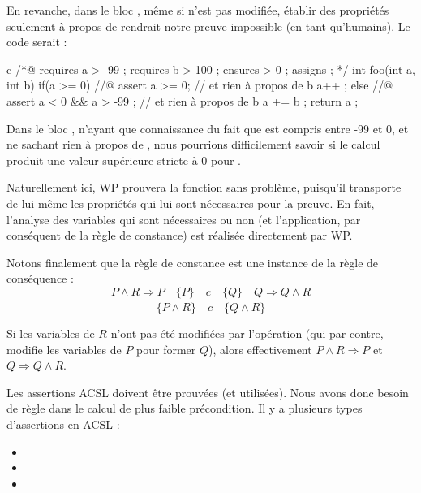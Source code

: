 En revanche, dans le bloc , même si  n'est pas modifiée, établir
des propriétés seulement à propos de  rendrait notre preuve impossible (en
tant qu'humains). Le code serait :



\begin{CodeBlock}{c}
/*@
  requires a > -99 ;
  requires b > 100 ;
  ensures  \result > 0 ;
  assigns  \nothing ;
*/
int foo(int a, int b){
  if(a >= 0){
    //@ assert a >= 0; // et rien à propos de b
    a++ ;
  } else {
    //@ assert a < 0 && a > -99 ; // et rien à propos de b
    a += b ;
  }
  return a ;
}
\end{CodeBlock}



Dans le bloc , n'ayant que connaissance du fait que  est compris
entre -99 et 0, et ne sachant rien à propos de , nous pourrions
difficilement savoir si le calcul  produit une valeur supérieure
stricte à 0 pour .



Naturellement ici, WP prouvera la fonction sans problème, puisqu'il transporte
de lui-même les propriétés qui lui sont nécessaires pour la preuve. En fait,
l'analyse des variables qui sont nécessaires ou non (et l'application, par
conséquent de la règle de constance) est réalisée directement par WP.



Notons finalement que la règle de constance est une instance de la règle de
conséquence :
$$\dfrac{P \wedge R \Rightarrow P \quad \{P\}\quad c\quad \{Q\} \quad Q \Rightarrow Q \wedge R}{\{P \wedge R\}\quad c\quad \{Q \wedge R\}}$$



Si les variables de $R$ n'ont pas été modifiées par l'opération (qui par contre,
modifie les variables de $P$ pour former $Q$), alors effectivement
$P \wedge R \Rightarrow P$ et $Q \Rightarrow Q \wedge R$.




Les assertions ACSL doivent être prouvées (et utilisées). Nous avons donc besoin
de règle dans le calcul de plus faible précondition. Il y a plusieurs types
d'assertions en ACSL :
\begin{itemize}
  \item {}
  \item {}
  \item {}
\end{itemize}



